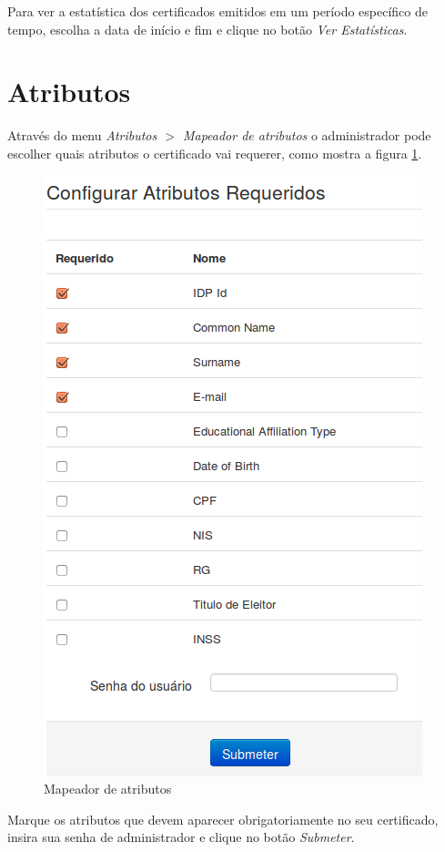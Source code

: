 Para ver a estatística dos certificados emitidos em um período específico de tempo, escolha a data de início e fim e clique no botão \emph{Ver Estatísticas}.

\section{Atributos}

Através do menu \textit{Atributos $>$ Mapeador de atributos} o administrador pode escolher quais atributos o certificado vai requerer, como mostra a figura \ref{fig:atmap}.

\begin{figure}[ht]
     \centering
     \includegraphics[scale=0.6]{images/attributesmapper.png}
     \caption{Mapeador de atributos}
     \label{fig:atmap}
\end{figure}

Marque os atributos que devem aparecer obrigatoriamente no seu certificado, insira sua senha de administrador e clique no botão \textit{Submeter}.

